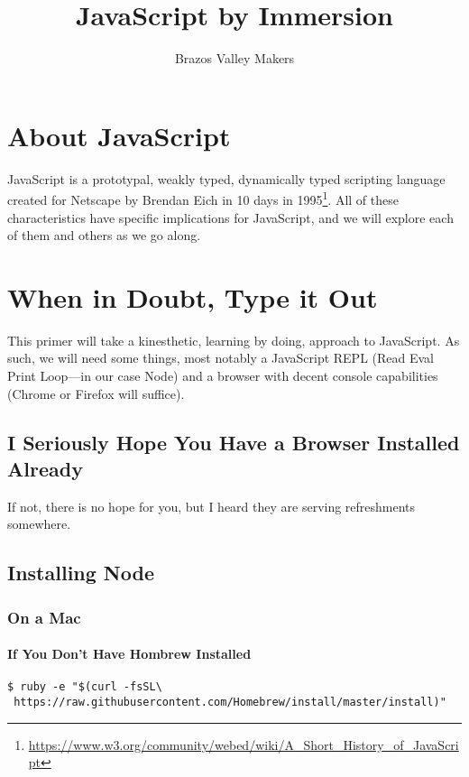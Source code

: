 \documentclass{article}
\begin{document}
\title{JavaScript by Immersion}
\author{Brazos Valley Makers}

\maketitle

\section{About JavaScript}
JavaScript is a prototypal, weakly typed, dynamically typed scripting language created for Netscape by Brendan Eich in 10 days in 1995\footnote{\url{ https://www.w3.org/community/webed/wiki/A_Short_History_of_JavaScript}}. All of these characteristics have specific implications for JavaScript, and we will explore each of them and others as we go along.

\section{When in Doubt, Type it Out}
This primer will take a kinesthetic, learning by doing, approach to JavaScript. As such, we will need some things, most notably a JavaScript REPL (Read Eval Print Loop—in our case Node) and a browser with decent console capabilities (Chrome or Firefox will suffice).

\subsection{I Seriously Hope You Have a Browser Installed Already}
If not, there is no hope for you, but I heard they are serving refreshments somewhere.

\subsection{Installing Node}

\subsubsection{On a Mac}

\paragraph{If You Don’t Have Hombrew Installed}

\begin{lstlisting}
$ ruby -e "$(curl -fsSL\
 https://raw.githubusercontent.com/Homebrew/install/master/install)"
\end{lstlisting}
\end{document}
